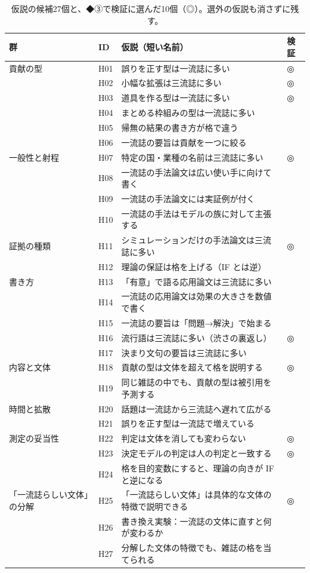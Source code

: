 \documentclass[a4paper,10pt]{ltjsarticle}
\begin{document}
\begin{table}[htbp]
\centering\small
\begin{tabularx}{\linewidth}{llXl}
\toprule
群 & ID & 仮説（短い名前） & 検証 \\
\midrule
貢献の型 & H01 & 誤りを正す型は一流誌に多い & ◎ \\
 & H02 & 小幅な拡張は三流誌に多い & ◎ \\
 & H03 & 道具を作る型は一流誌に多い & ◎ \\
 & H04 & まとめる枠組みの型は一流誌に多い &  \\
 & H05 & 帰無の結果の書き方が格で違う &  \\
 & H06 & 一流誌の要旨は貢献を一つに絞る &  \\
一般性と射程 & H07 & 特定の国・業種の名前は三流誌に多い & ◎ \\
 & H08 & 一流誌の手法論文は広い使い手に向けて書く &  \\
 & H09 & 一流誌の手法論文には実証例が付く &  \\
 & H10 & 一流誌の手法はモデルの族に対して主張する &  \\
証拠の種類 & H11 & シミュレーションだけの手法論文は三流誌に多い & ◎ \\
 & H12 & 理論の保証は格を上げる（IF とは逆） &  \\
書き方 & H13 & 「有意」で語る応用論文は三流誌に多い &  \\
 & H14 & 一流誌の応用論文は効果の大きさを数値で書く &  \\
 & H15 & 一流誌の要旨は「問題→解決」で始まる &  \\
 & H16 & 流行語は三流誌に多い（渋さの裏返し） & ◎ \\
 & H17 & 決まり文句の要旨は三流誌に多い &  \\
内容と文体 & H18 & 貢献の型は文体を超えて格を説明する & ◎ \\
 & H19 & 同じ雑誌の中でも、貢献の型は被引用を予測する &  \\
時間と拡散 & H20 & 話題は一流誌から三流誌へ遅れて広がる &  \\
 & H21 & 誤りを正す型は一流誌で増えている &  \\
測定の妥当性 & H22 & 判定は文体を消しても変わらない & ◎ \\
 & H23 & 決定モデルの判定は人の判定と一致する & ◎ \\
 & H24 & 格を目的変数にすると、理論の向きが IF と逆になる &  \\
「一流誌らしい文体」の分解 & H25 & 「一流誌らしい文体」は具体的な文体の特徴で説明できる & ◎ \\
 & H26 & 書き換え実験：一流誌の文体に直すと何が変わるか &  \\
 & H27 & 分解した文体の特徴でも、雑誌の格を当てられる &  \\
\bottomrule
\end{tabularx}
\caption{仮説の候補27個と、◆③で検証に選んだ10個（◎）。選外の仮説も消さずに残す。}
\label{tab:mc-hyp}
\end{table}
\end{document}
